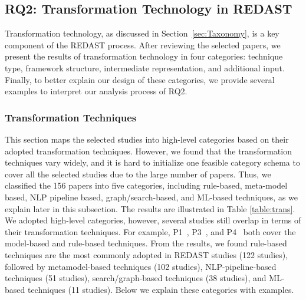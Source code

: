 \subsection{RQ2: Transformation Technology in REDAST}

Transformation technology, as discussed in Section~\ref{sec:Taxonomy}, is a key component of the REDAST process. After reviewing the selected papers, we present the results of transformation technology in four categories: technique type, framework structure, intermediate representation, and additional input. Finally, to better explain our design of these categories, we provide several examples to interpret our analysis process of RQ2.


\subsubsection{Transformation Techniques}


This section maps the selected studies into high-level categories based on their adopted transformation techniques. However, we found that the transformation techniques vary widely, and it is hard to initialize one feasible category schema to cover all the selected studies due to the large number of papers. Thus, we classified the 156 papers into five categories, including rule-based, meta-model based, NLP pipeline based, graph/search-based, and ML-based techniques, as we explain later in this subsection. The results are illustrated in Table \ref{table:trans}. We adopted high-level categories, however, several studies still overlap in terms of their transformation techniques. For example, P1~, P3~, and P4~ both cover the model-based and rule-based techniques. From the results, we found rule-based techniques are the most commonly adopted in REDAST studies (122 studies), followed by metamodel-based techniques (102 studies), NLP-pipeline-based techniques (51 studies), search/graph-based techniques (38 studies), and ML-based techniques (11 studies). Below we explain these categories with examples.

